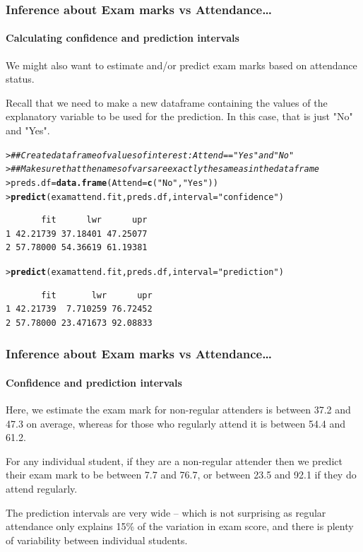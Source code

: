 \documentclass{beamer}\usepackage[]{graphicx}\usepackage[]{xcolor}
\makeatletter
\newcommand{\hlstr}[1]{\textcolor[rgb]{0.192,0.494,0.8}{#1}}%
\newcommand{\hlcom}[1]{\textcolor[rgb]{0.678,0.584,0.686}{\textit{#1}}}%
\newcommand{\hlstd}[1]{\textcolor[rgb]{0.345,0.345,0.345}{#1}}%
\newcommand{\hlkwb}[1]{\textcolor[rgb]{0.69,0.353,0.396}{#1}}%
\newcommand{\hlkwc}[1]{\textcolor[rgb]{0.333,0.667,0.333}{#1}}%
\newcommand{\hlkwd}[1]{\textcolor[rgb]{0.737,0.353,0.396}{\textbf{#1}}}%
\newenvironment{kframe}{%
 \def\at@end@of@kframe{}%
 \ifinner\ifhmode%
  \def\at@end@of@kframe{\end{minipage}}%
  \begin{minipage}{\columnwidth}%
 \fi\fi%
 \def\FrameCommand##1{\hskip\@totalleftmargin \hskip-\fboxsep
 \colorbox{shadecolor}{##1}\hskip-\fboxsep
     \hskip-\linewidth \hskip-\@totalleftmargin \hskip\columnwidth}%
 \MakeFramed {\advance\hsize-\width
   \@totalleftmargin\z@ \linewidth\hsize
   \@setminipage}}%
 {\par\unskip\endMakeFramed%
 \at@end@of@kframe}
\newenvironment{knitrout}{}{} %
\makeatother
\begin{document}
\begin{frame}[fragile]
\frametitle{Inference about Exam marks vs Attendance\ldots}
\framesubtitle{Calculating confidence and prediction intervals}

We might also want to estimate and/or predict exam marks based on attendance status.

\medskip

Recall that we need to make a new dataframe containing the values of the explanatory
variable to be used for the prediction. In this case, that is just "No" and "Yes".

\begin{knitrout}\scriptsize
{}\color{fgcolor}\begin{kframe}
\begin{alltt}
\hlstd{> }\hlcom{## Create data frame of values of interest: Attend=="Yes" and "No"}
\hlstd{> }\hlcom{## Make sure that the names of vars are exactly the same as in the data frame}
\hlstd{> }\hlstd{preds.df} \hlkwb{=} \hlkwd{data.frame}\hlstd{(}\hlkwc{Attend} \hlstd{=} \hlkwd{c}\hlstd{(}\hlstr{"No"}\hlstd{,} \hlstr{"Yes"}\hlstd{))}
\hlstd{> }\hlkwd{predict}\hlstd{(examattend.fit, preds.df,} \hlkwc{interval} \hlstd{=} \hlstr{"confidence"}\hlstd{)}
\end{alltt}
\begin{verbatim}
       fit      lwr      upr
1 42.21739 37.18401 47.25077
2 57.78000 54.36619 61.19381
\end{verbatim}
\begin{alltt}
\hlstd{> }\hlkwd{predict}\hlstd{(examattend.fit, preds.df,} \hlkwc{interval} \hlstd{=} \hlstr{"prediction"}\hlstd{)}
\end{alltt}
\begin{verbatim}
       fit       lwr      upr
1 42.21739  7.710259 76.72452
2 57.78000 23.471673 92.08833
\end{verbatim}
\end{kframe}
\end{knitrout}
\end{frame}


\begin{frame}[fragile]
\frametitle{Inference about Exam marks vs Attendance\ldots}
\framesubtitle{Confidence and prediction intervals}

Here, we estimate the exam mark for non-regular attenders is between 37.2 and 47.3 on average, whereas for those who regularly attend it is between 54.4 and 61.2.

\medskip

For any individual student, if they are a non-regular attender then we predict their
exam mark to be between 7.7 and 76.7, or between 23.5 and 92.1 if they do attend regularly.

\medskip

The prediction intervals are very wide -- which is not surprising as regular attendance only explains 15\%  of the variation in exam score, and there is plenty of variability
between individual students.
\end{frame}
\end{document}
